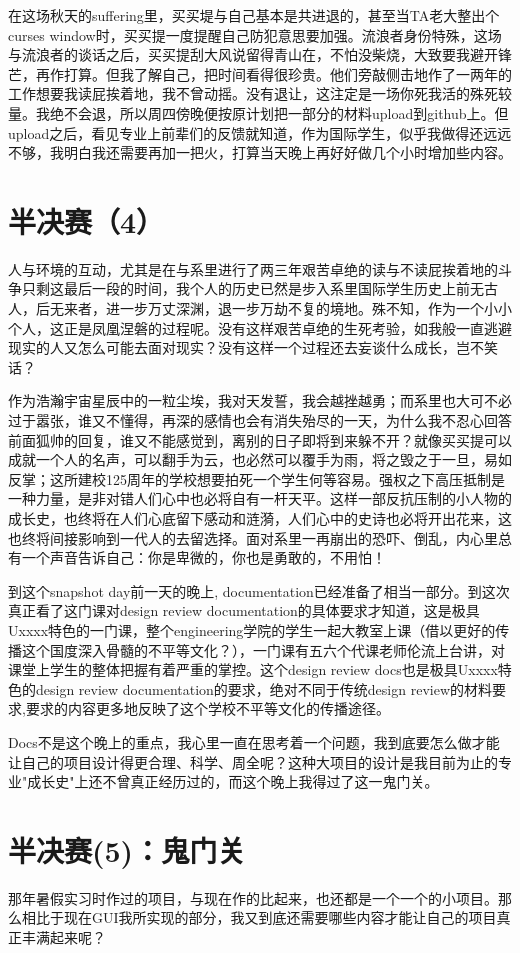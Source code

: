 \documentclass[12pt]{book}
\begin{document}
在这场秋天的suffering里，买买堤与自己基本是共进退的，甚至当TA老大整出个curses window时，买买提一度提醒自己防犯意思要加强。流浪者身份特殊，这场与流浪者的谈话之后，买买提刮大风说留得青山在，不怕没柴烧，大致要我避开锋芒，再作打算。但我了解自己，把时间看得很珍贵。他们旁敲侧击地作了一两年的工作想要我读屁挨着地，我不曾动摇。没有退让，这注定是一场你死我活的殊死较量。我绝不会退，所以周四傍晚便按原计划把一部分的材料upload到github上。但upload之后，看见专业上前辈们的反馈就知道，作为国际学生，似乎我做得还远远不够，我明白我还需要再加一把火，打算当天晚上再好好做几个小时增加些内容。
\section{半决赛（4）}
\label{sec-35-4}
人与环境的互动，尤其是在与系里进行了两三年艰苦卓绝的读与不读屁挨着地的斗争只剩这最后一段的时间，我个人的历史已然是步入系里国际学生历史上前无古人，后无来者，进一步万丈深渊，退一步万劫不复的境地。殊不知，作为一个小小个人，这正是凤凰涅磐的过程呢。没有这样艰苦卓绝的生死考验，如我般一直逃避现实的人又怎么可能去面对现实？没有这样一个过程还去妄谈什么成长，岂不笑话？

作为浩瀚宇宙星辰中的一粒尘埃，我对天发誓，我会越挫越勇；而系里也大可不必过于嚣张，谁又不懂得，再深的感情也会有消失殆尽的一天，为什么我不忍心回答前面狐帅的回复，谁又不能感觉到，离别的日子即将到来躲不开？就像买买提可以成就一个人的名声，可以翻手为云，也必然可以覆手为雨，将之毁之于一旦，易如反掌；这所建校125周年的学校想要拍死一个学生何等容易。强权之下高压抵制是一种力量，是非对错人们心中也必将自有一杆天平。这样一部反抗压制的小人物的成长史，也终将在人们心底留下感动和涟漪，人们心中的史诗也必将开出花来，这也终将间接影响到一代人的去留选择。面对系里一再崩出的恐吓、倒乱，内心里总有一个声音告诉自己：你是卑微的，你也是勇敢的，不用怕！

到这个snapshot day前一天的晚上, documentation已经准备了相当一部分。到这次真正看了这门课对design review documentation的具体要求才知道，这是极具Uxxxx特色的一门课，整个engineering学院的学生一起大教室上课（借以更好的传播这个国度深入骨髓的不平等文化？），一门课有五六个代课老师伦流上台讲，对课堂上学生的整体把握有着严重的掌控。这个design review docs也是极具Uxxxx特色的design review documentation的要求，绝对不同于传统design review的材料要求,要求的内容更多地反映了这个学校不平等文化的传播途径。

Docs不是这个晚上的重点，我心里一直在思考着一个问题，我到底要怎么做才能让自己的项目设计得更合理、科学、周全呢？这种大项目的设计是我目前为止的专业"成长史"上还不曾真正经历过的，而这个晚上我得过了这一鬼门关。
\section{半决赛(5)：鬼门关}
\label{sec-35-5}
那年暑假实习时作过的项目，与现在作的比起来，也还都是一个一个的小项目。那么相比于现在GUI我所实现的部分，我又到底还需要哪些内容才能让自己的项目真正丰满起来呢？
\end{document}
